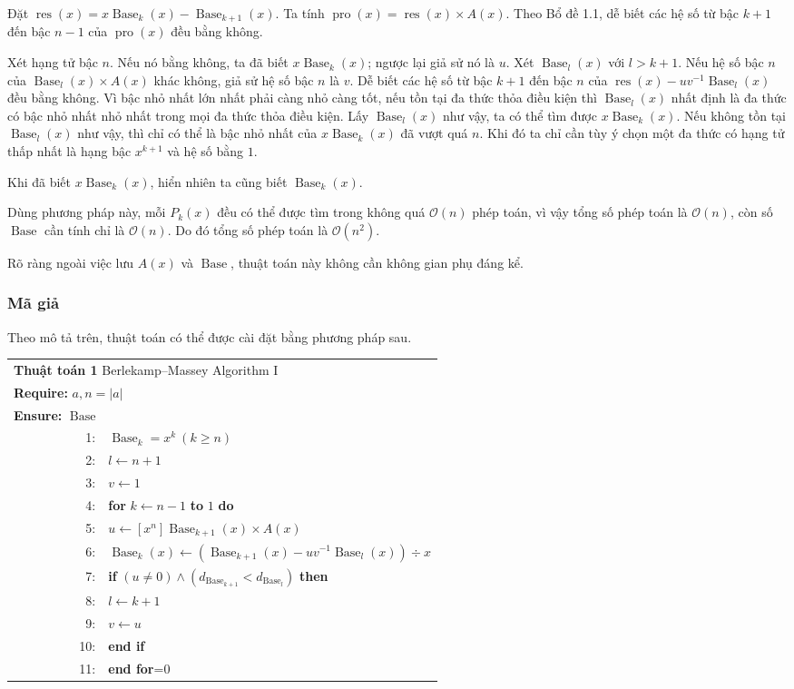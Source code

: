 \documentclass[11pt]{article}
\newcommand{\Oh}{\mathcal{O}}
\newcommand{\Base}{\operatorname{Base}}
\newcommand{\Res}{\operatorname{res}}
\newcommand{\Pro}{\operatorname{pro}}
\begin{document}
Đặt \(\Res(x)=x\Base_k(x)-\Base_{k+1}(x)\). Ta tính
\(\Pro(x)=\Res(x)\times A(x)\). Theo Bổ đề 1.1, dễ biết các hệ số từ bậc
\(k+1\) đến bậc \(n-1\) của \(\Pro(x)\) đều bằng không.

Xét hạng tử bậc \(n\). Nếu nó bằng không, ta đã biết \(x\Base_k(x)\); ngược lại
giả sử nó là \(u\). Xét \(\Base_l(x)\) với \(l>k+1\). Nếu hệ số bậc \(n\) của
\(\Base_l(x)\times A(x)\) khác không, giả sử hệ số bậc \(n\) là \(v\). Dễ biết
các hệ số từ bậc \(k+1\) đến bậc \(n\) của
\(\Res(x)-uv^{-1}\Base_l(x)\) đều bằng không. Vì bậc nhỏ nhất lớn nhất phải
càng nhỏ càng tốt, nếu tồn tại đa thức thỏa điều kiện thì \(\Base_l(x)\) nhất
định là đa thức có bậc nhỏ nhất nhỏ nhất trong mọi đa thức thỏa điều kiện. Lấy
\(\Base_l(x)\) như vậy, ta có thể tìm được \(x\Base_k(x)\). Nếu không tồn tại
\(\Base_l(x)\) như vậy, thì chỉ có thể là bậc nhỏ nhất của \(x\Base_k(x)\) đã
vượt quá \(n\). Khi đó ta chỉ cần tùy ý chọn một đa thức có hạng tử thấp nhất
là hạng bậc \(x^{k+1}\) và hệ số bằng \(1\).

Khi đã biết \(x\Base_k(x)\), hiển nhiên ta cũng biết \(\Base_k(x)\).

Dùng phương pháp này, mỗi \(P_k(x)\) đều có thể được tìm trong không quá
\(\Oh(n)\) phép toán, vì vậy tổng số phép toán là \(\Oh(n)\), còn số \(\Base\)
cần tính chỉ là \(\Oh(n)\). Do đó tổng số phép toán là \(\Oh(n^2)\).

Rõ ràng ngoài việc lưu \(A(x)\) và \(\Base\), thuật toán này không cần không
gian phụ đáng kể.

\subsubsection{Mã giả}

Theo mô tả trên, thuật toán có thể được cài đặt bằng phương pháp sau.

\begin{center}
\small
\begin{tabular}{r@{\quad}p{0.78\linewidth}}
\multicolumn{2}{l}{\textbf{Thuật toán 1} Berlekamp--Massey Algorithm I}\\
\multicolumn{2}{l}{\textbf{Require:} \(a, n=|a|\)}\\
\multicolumn{2}{l}{\textbf{Ensure:} \(\Base\)}\\
1: & \(\Base_k=x^k\ (k\ge n)\)\\
2: & \(l\gets n+1\)\\
3: & \(v\gets 1\)\\
4: & \textbf{for} \(k\gets n-1\) \textbf{to} \(1\) \textbf{do}\\
5: & \quad \(u\gets [x^n]\Base_{k+1}(x)\times A(x)\)\\
6: & \quad \(\Base_k(x)\gets(\Base_{k+1}(x)-uv^{-1}\Base_l(x))\div x\)\\
7: & \quad \textbf{if} \((u\ne 0)\wedge(d_{\Base_{k+1}}<d_{\Base_l})\)
      \textbf{then}\\
8: & \qquad \(l\gets k+1\)\\
9: & \qquad \(v\gets u\)\\
10: & \quad \textbf{end if}\\
11: & \textbf{end for}=0
\end{tabular}
\end{center}
\end{document}
